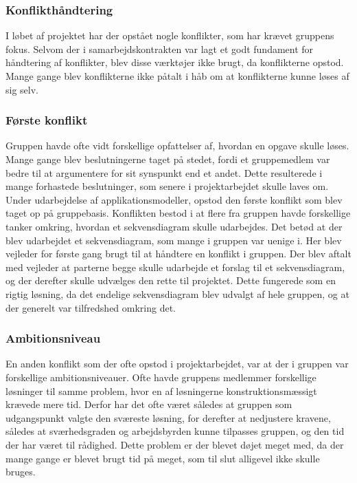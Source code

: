 \subsubsection{Konflikthåndtering}
I løbet af projektet har der opstået nogle konflikter, som har krævet gruppens fokus. Selvom der i samarbejdskontrakten var lagt et godt fundament for håndtering af konflikter, blev disse værktøjer ikke brugt, da konflikterne opstod. Mange gange blev konflikterne ikke påtalt i håb om at konflikterne kunne løses af sig selv. 

\subsubsection{Første konflikt}
Gruppen havde ofte vidt forskellige opfattelser af, hvordan en opgave skulle løses. Mange gange blev beslutningerne taget på stedet, fordi et gruppemedlem var bedre til at argumentere for sit synspunkt end et andet. Dette resulterede i mange forhastede beslutninger, som senere i projektarbejdet skulle laves om. Under udarbejdelse af applikationsmodeller, opstod den første konflikt som blev taget op på gruppebasis. Konflikten bestod i at flere fra gruppen havde 
forskellige tanker omkring, hvordan et sekvensdiagram skulle udarbejdes. Det betød at der blev udarbejdet et sekvensdiagram, som mange i gruppen var uenige i. Her blev vejleder for første gang brugt til at håndtere en konflikt i gruppen. Der blev aftalt med vejleder at parterne begge skulle udarbejde et forslag til et sekvensdiagram, og der derefter skulle udvælges den rette til projektet. Dette fungerede som en rigtig løsning, da det endelige sekvensdiagram blev udvalgt af hele gruppen, og at der generelt var tilfredshed omkring det.

\subsubsection{Ambitionsniveau}
En anden konflikt som der ofte opstod i projektarbejdet, var at der i gruppen var forskellige ambitionsniveauer. Ofte havde gruppens medlemmer forskellige løsninger til samme problem, hvor en af løsningerne konstruktionsmæssigt krævede mere tid. Derfor har det ofte været således at gruppen som udgangspunkt valgte den sværeste løsning, for derefter at nedjustere kravene, således at sværhedsgraden og arbejdsbyrden kunne tilpasses gruppen, og den tid der har været til rådighed. Dette problem er der blevet døjet meget med, da der mange gange er blevet brugt tid på meget, som til slut alligevel ikke skulle bruges. 

